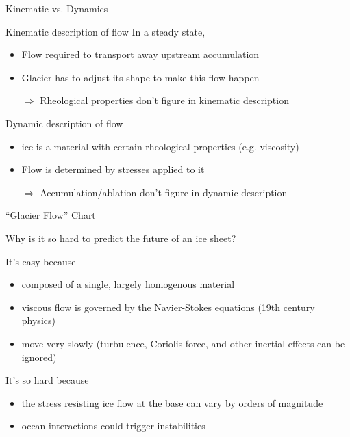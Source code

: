 \documentclass[hide notes,intlimits]{beamer}
\begin{document}
\begin{frame}{Kinematic vs. Dynamics}
  \begin{block}{Kinematic description of flow}
    In a steady state,
    \begin{itemize}
    \item Flow required to transport away upstream accumulation
    \item Glacier has to adjust its shape to make this flow happen
    \item[$\Rightarrow$] Rheological properties don't figure in kinematic description
    \end{itemize}
  \end{block}
  \begin{block}{Dynamic description of flow}
    \begin{itemize}
    \item ice is a material with certain rheological properties (e.g. viscosity)
    \item Flow is determined by stresses applied to it
    \item[$\Rightarrow$] Accumulation/ablation don't figure in dynamic description
    \end{itemize}
  \end{block}
\end{frame}

\begin{frame}{``Glacier Flow'' Chart}
  \begin{figure}
    \centering{
      
    }
  \end{figure}
\end{frame}


\begin{frame}{Why is it so hard to predict the future of an ice sheet?}
  \begin{block}{It's easy because}
   \begin{itemize}
    \item composed of a single, largely homogenous material
    \item viscous flow is governed by the Navier-Stokes equations (19th century physics)
    \item move very slowly (turbulence, Coriolis force, and other inertial effects can be ignored)
   \end{itemize}
  \end{block}
  \begin{block}{It's so hard because}
   \begin{itemize}
    \item the stress resisting ice flow at the base can vary by orders of magnitude
    \item ocean interactions could trigger instabilities
  \end{itemize}
  \end{block}
\end{frame}
\end{document}
